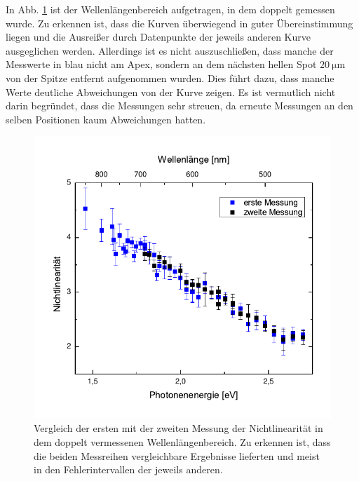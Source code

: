 \documentclass[bachelor,       %
               twoside,        %
               BCOR10mm,       %
               english,ngerman, %
               ]{GAUBM}
\begin{document}
In Abb. \ref{fig:ges_messung} ist der Wellenlängenbereich aufgetragen, in dem doppelt gemessen wurde.
Zu erkennen ist, dass die Kurven überwiegend in guter Übereinstimmung liegen und die Ausreißer durch Datenpunkte der jeweils anderen Kurve ausgeglichen werden.
Allerdings ist es nicht auszuschließen, dass manche der Messwerte in blau nicht am Apex, sondern an dem nächsten hellen Spot $\SI{20}{\micro\meter}$ von der Spitze entfernt aufgenommen wurden.
Dies führt dazu, dass manche Werte deutliche Abweichungen von der Kurve zeigen.
Es ist vermutlich nicht darin begründet, dass die Messungen sehr streuen, da erneute Messungen an den selben Positionen kaum Abweichungen hatten.
\begin{figure}[h]
	\centering
	\includegraphics{Vergleich}
	\caption{Vergleich der ersten mit der zweiten Messung der Nichtlinearität in dem doppelt vermessenen Wellenlängenbereich. Zu erkennen ist, dass die beiden Messreihen vergleichbare Ergebnisse lieferten und meist in den Fehlerintervallen der jeweils anderen.}
	\label{fig:ges_messung}
\end{figure}
\end{document}
